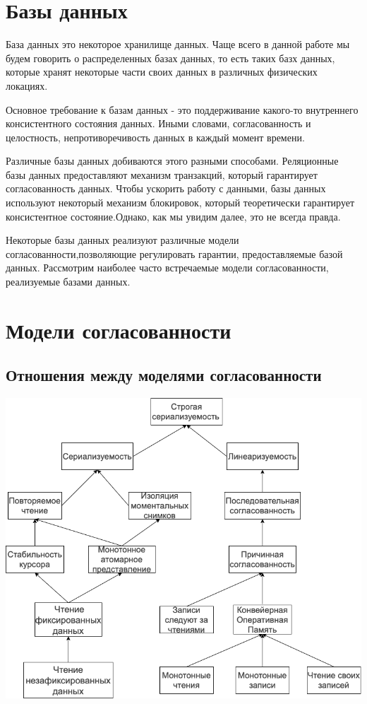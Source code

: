 \documentclass[12pt,  openany]{book}
\begin{document}
\section{Базы данных}
База данных это некоторое хранилище данных.  Чаще всего в данной работе мы будем говорить о распределенных базах данных, то есть таких базх данных,  которые хранят некоторые части своих данных в различных физических локациях.
\par
Основное требование к базам данных - это поддерживание какого-то внутреннего консистентного состояния данных. Иными словами, согласованность и целостность, непротиворечивость данных в каждый момент времени.
\par
Различные базы данных добиваются этого разными способами. Реляционные базы данных предоставляют механизм транзакций, который гарантирует согласованность данных. Чтобы ускорить работу с данными, базы данных используют некоторый механизм блокировок, который теоретически гарантирует консистентное состояние.Однако, как мы увидим далее, это не всегда правда.
\par
Некоторые базы данных реализуют различные модели согласованности,позволяющие регулировать гарантии, предоставляемые базой данных. Рассмотрим наиболее часто встречаемые модели согласованности, реализуемые базами данных.
\section{Модели согласованности \cite{jepsenConsistencyModels}}
\subsection{Отношения между моделями согласованности}
\includegraphics[scale=0.5]{model-consistency.png}
\end{document}
